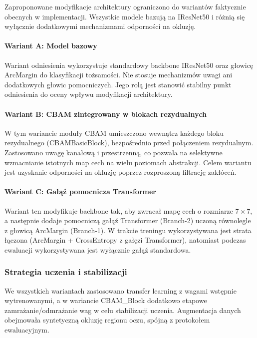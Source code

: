 Zaproponowane modyfikacje architektury ograniczono do wariantów faktycznie obecnych w implementacji. Wszystkie modele bazują na IResNet50 i różnią się wyłącznie dodatkowymi mechanizmami odporności na okluzję.

\paragraph{Wariant A: Model bazowy}
Wariant odniesienia wykorzystuje standardowy backbone IResNet50 oraz głowicę ArcMargin do klasyfikacji tożsamości. Nie stosuje mechanizmów uwagi ani dodatkowych głowic pomocniczych. Jego rolą jest stanowić stabilny punkt odniesienia do oceny wpływu modyfikacji architektury.

\paragraph{Wariant B: CBAM zintegrowany w blokach rezydualnych}
W tym wariancie moduły CBAM umieszczono wewnątrz każdego bloku rezydualnego (CBAMBasicBlock), bezpośrednio przed połączeniem rezydualnym. Zastosowano uwagę kanałową i przestrzenną, co pozwala na selektywne wzmacnianie istotnych map cech na wielu poziomach abstrakcji. Celem wariantu jest uzyskanie odporności na okluzję poprzez rozproszoną filtrację zakłóceń.

\paragraph{Wariant C: Gałąź pomocnicza Transformer}
Wariant ten modyfikuje backbone tak, aby zwracał mapę cech o rozmiarze $7\times7$, a następnie dodaje pomocniczą gałąź Transformer (Branch-2) uczoną równolegle z głowicą ArcMargin (Branch-1). W trakcie treningu wykorzystywana jest strata łączona (ArcMargin + CrossEntropy z gałęzi Transformer), natomiast podczas ewaluacji wykorzystywana jest wyłącznie gałąź standardowa.

\subsubsection{Strategia uczenia i stabilizacji}
We wszystkich wariantach zastosowano transfer learning z wagami wstępnie wytrenowanymi, a w wariancie CBAM\_Block dodatkowo etapowe zamrażanie/odmrażanie wag w celu stabilizacji uczenia. Augmentacja danych obejmowała syntetyczną okluzję regionu oczu, spójną z protokołem ewaluacyjnym.
